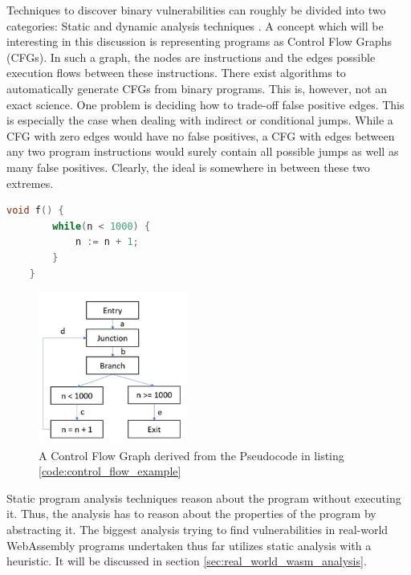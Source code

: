 \documentclass[sigconf]{acmart}
\begin{document}
{Techniques to discover binary vulnerabilities can roughly be divided into two categories: Static and dynamic analysis techniques \cite{shoshitaishvili_sok_2016}. A concept which will be interesting in this discussion is representing programs as Control Flow Graphs (CFGs). In such a graph, the nodes are instructions and the edges possible execution flows between these instructions. There exist algorithms to automatically generate CFGs from binary programs. This is, however, not an exact science. One problem is deciding how to trade-off false positive edges. This is especially the case when dealing with indirect or conditional jumps. While a CFG with zero edges would have no false positives, a CFG with edges between any two program instructions would surely contain all possible jumps as well as many false positives. Clearly, the ideal is somewhere in between these two extremes.

\begin{lstlisting}[language=C++, label=code:control_flow_example, caption={This pseudocode corresponds to the control flow graph in Figure \ref{fig:vuln_example_redirect_control_flow}}]
	void f() {
		while(n < 1000) {
			n := n + 1;	
		}
	}
\end{lstlisting}

\begin{figure}[h]
  \centering
  \includegraphics[height=5cm]{control-flow-graph}
  \caption{A Control Flow Graph derived from the Pseudocode in listing \ref{code:control_flow_example}}  
\label{fig:vuln_example_redirect_control_flow}
\end{figure}

Static program analysis techniques reason about the program without executing it. Thus, the analysis has to reason about the properties of the program by abstracting it. The biggest analysis trying to find vulnerabilities in real-world WebAssembly programs undertaken thus far utilizes static analysis with a heuristic. It will be discussed in section \ref{sec:real_world_wasm_analysis}.

}
\end{document}
